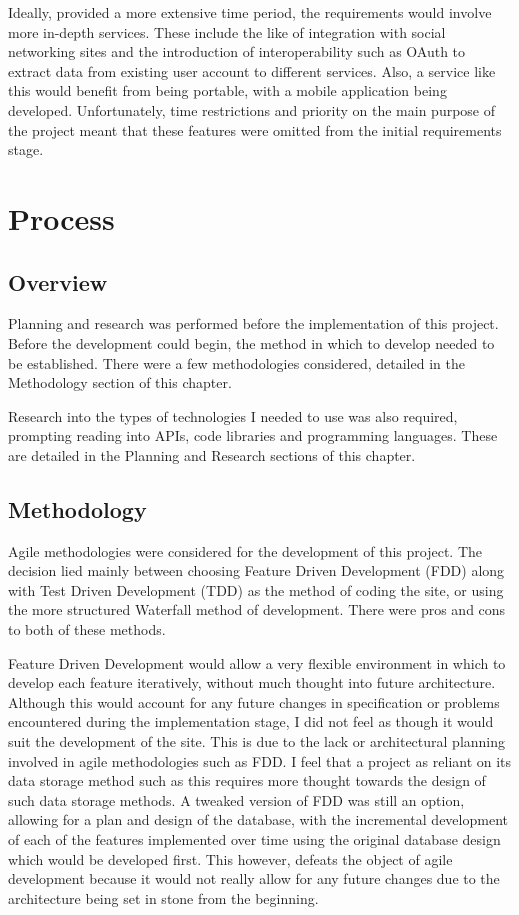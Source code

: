 Ideally, provided a more extensive time period, the requirements would involve more in-depth services. These include the like of integration with social networking sites and the introduction of interoperability such as OAuth\cite{oauth} to extract data from existing user account to different services. Also, a service like this would benefit from being portable, with a mobile application being developed. Unfortunately, time restrictions and priority on the main purpose of the project meant that these features were omitted from the initial requirements stage.

\section{Process}
\subsection{Overview}
Planning and research was performed before the implementation of this project. Before the development could begin, the method in which to develop needed to be established. There were a few methodologies considered, detailed in the Methodology section of this chapter.

Research into the types of technologies I needed to use was also required, prompting reading into APIs, code libraries and programming languages. These are detailed in the Planning and Research sections of this chapter.

\subsection{Methodology}
Agile methodologies were considered for the development of this project. The decision lied mainly between choosing Feature Driven Development (FDD) along with Test Driven Development (TDD) as the method of coding the site, or using the more structured Waterfall method of development. There were pros and cons to both of these methods. 

Feature Driven Development would allow a very flexible environment in which to develop each feature iteratively, without much thought into future architecture. Although this would account for any future changes in specification or problems encountered during the implementation stage, I did not feel as though it would suit the development of the site. This is due to the lack or architectural planning involved in agile methodologies such as FDD. I feel that a project as reliant on its data storage method such as this requires more thought towards the design of such data storage methods. A tweaked version of FDD was still an option, allowing for a plan and design of the database, with the incremental development of each of the features implemented over time using the original database design which would be developed first. This however, defeats the object of agile development because it would not really allow for any future changes due to the architecture being set in stone from the beginning.

